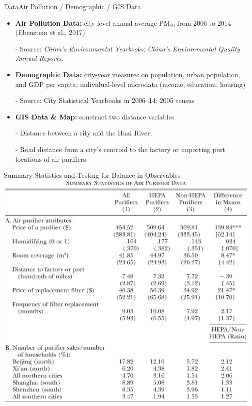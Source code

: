 \documentclass{beamer}
\begin{document}
\begin{frame}{Data}{Air Pollution / Demographic / GIS Data}
	\begin{itemize}
		\item \textbf{Air Pollution Data:} city-level annual average PM$_{10}$ from 2006 to 2014 (Ebenstein et al., 2017).
		\item [-] {\small Source: \textit{China's Environmental Yearbooks}; \textit{China's Environmental Quality Annual Reports}.}
		\item \textbf{Demographic Data:} city-year measures on population, urban population, and GDP per capita; individual-level microdata (income, education, housing)
		\item [-] {\small Source: City Statistical Yearbooks in 2006–14; 2005 census}
		\item \textbf{GIS Data \& Map:} construct two distance variables
		\item [-] Distance between a city and the Huai River;
		\item [-] Road distance from a city’s centroid to the factory or importing port locations of air purifiers.
	\end{itemize}
\end{frame}
\begin{frame}{Summary Statistics and Testing for Balance in Observables}
	\centering
	\includegraphics[scale=0.35]{table1.png}
\end{frame}
\end{document}
